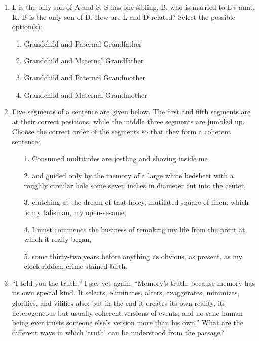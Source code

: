 \documentclass[12pt]{article}
\theoremstyle{remark}
\begin{document}
\begin{enumerate}
\begin{enumerate}
\end{enumerate}
\hfill{}
\item L is the only son of A and S. S has one sibling, B, who is married to L’s aunt, K. B is the only son of D. How are L and D related? Select the possible option(s):
\begin{enumerate}
    \item Grandchild and Paternal Grandfather
    \item Grandchild and Maternal Grandfather
    \item Grandchild and Paternal Grandmother
    \item Grandchild and Maternal Grandmother
\end{enumerate}
\hfill{}
\item Five segments of a sentence are given below. The first and fifth segments are at their correct positions, while the middle three segments  are jumbled up. Choose the correct order of the segments so that they form a coherent sentence:
\begin{enumerate}
    \item[1.] Consumed multitudes are jostling and shoving inside me
    \item[2.] and guided only by the memory of a large white bedsheet with a roughly circular hole some seven inches in diameter cut into the center, 
    \item[3.] clutching at the dream of that holey, mutilated square of linen, which is my talisman, my open-sesame,
    \item[4.] I must commence the business of remaking my life from the point at which it really began, 
    \item[5.] some thirty-two years before anything as obvious, as present, as my clock-ridden, crime-stained birth. 
\end{enumerate}
\begin{enumerate}
\end{enumerate}
\hfill{}
\item “I told you the truth,” I say yet again, “Memory’s truth, because memory has its own special kind. It selects, eliminates, alters, exaggerates, minimizes, glorifies, and vilifies also; but in the end it creates its own reality, its heterogeneous but usually coherent versions of events; and no sane human being ever trusts someone else’s version more than his own.” What are the different ways in which ‘truth’ can be understood from the passage?

\end{enumerate}
\end{document}
